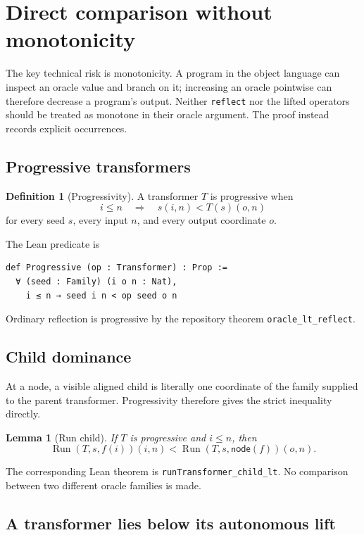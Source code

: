\documentclass[11pt]{article}
\newtheorem{lemma}[theorem]{Lemma}
\theoremstyle{definition}
\newtheorem{definition}[theorem]{Definition}
\theoremstyle{remark}
\newcommand{\Run}{\operatorname{Run}}
\newcommand{\lean}[1]{\texttt{#1}}
\begin{document}
\section{Direct comparison without monotonicity}
\label{sec:comparison}

The key technical risk is monotonicity.  A program in the object language can
inspect an oracle value and branch on it; increasing an oracle pointwise can
therefore decrease a program's output.  Neither \lean{reflect} nor the lifted
operators should be treated as monotone in their oracle argument.  The proof
instead records explicit occurrences.

\subsection{Progressive transformers}

\begin{definition}[Progressivity]
A transformer \(T\) is progressive when
\[
  i\le n \quad\Longrightarrow\quad
  s(i,n)<T(s)(o,n)
\]
for every seed \(s\), every input \(n\), and every output coordinate \(o\).
\end{definition}

The Lean predicate is
\begin{lstlisting}
def Progressive (op : Transformer) : Prop :=
  ∀ (seed : Family) (i o n : Nat),
    i ≤ n → seed i n < op seed o n
\end{lstlisting}
Ordinary reflection is progressive by the repository theorem
\lean{oracle\_lt\_reflect}.

\subsection{Child dominance}

At a node, a visible aligned child is literally one coordinate of the family
supplied to the parent transformer.  Progressivity therefore gives the strict
inequality directly.

\begin{lemma}[Run child]
If \(T\) is progressive and \(i\le n\), then
\[
  \Run(T,s,f(i))(i,n)
  <\Run(T,s,\mathsf{node}(f))(o,n).
\]
\end{lemma}

The corresponding Lean theorem is \lean{runTransformer\_child\_lt}.  No
comparison between two different oracle families is made.

\subsection{A transformer lies below its autonomous lift}
\end{document}
